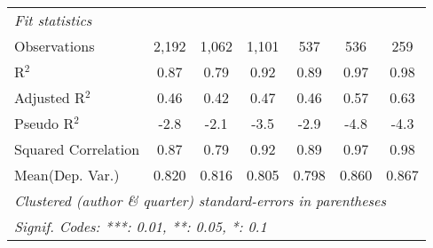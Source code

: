 \begin{tabular}{lcccccc}
   \midrule
   \emph{Fit statistics}\\
   Observations                                               & 2,192   & 1,062   & 1,101          & 537           & 536          & 259\\  
   R$^2$                                                      & 0.87    & 0.79    & 0.92           & 0.89          & 0.97         & 0.98\\  
   Adjusted R$^2$                                             & 0.46    & 0.42    & 0.47           & 0.46          & 0.57         & 0.63\\  
   Pseudo R$^2$                                               & -2.8    & -2.1    & -3.5           & -2.9          & -4.8         & -4.3\\  
   Squared Correlation                                        & 0.87    & 0.79    & 0.92           & 0.89          & 0.97         & 0.98\\  
Mean(Dep. Var.) & 0.820 & 0.816 & 0.805 & 0.798 & 0.860 & 0.867 \\
   \midrule \midrule
   \multicolumn{7}{l}{\emph{Clustered (author \& quarter) standard-errors in parentheses}}\\
   \multicolumn{7}{l}{\emph{Signif. Codes: ***: 0.01, **: 0.05, *: 0.1}}\\
\end{tabular}
\par\endgroup
